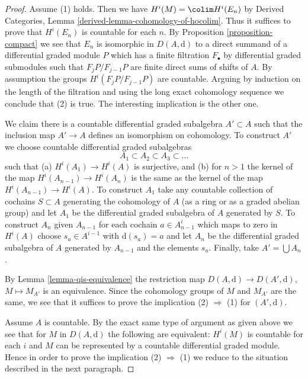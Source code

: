 \begin{proof}
Assume (1) holds. Then we have $H^i(M) = \colim H^i(E_n)$ by
Derived Categories, Lemma \ref{derived-lemma-cohomology-of-hocolim}.
Thus it suffices to prove that $H^i(E_n)$ is countable for each $n$.
By Proposition \ref{proposition-compact} we see that $E_n$
is isomorphic in $D(A, \text{d})$ to a direct summand of a
differential graded module $P$ which has a finite filtration
$F_\bullet$ by differential graded submodules
such that $F_jP/F_{j - 1}P$ are finite direct sums of shifts of $A$.
By assumption the groups $H^i(F_jP/F_{j - 1}P)$ are countable.
Arguing by induction on the length of the filtration and using
the long exact cohomology sequence we conclude that (2) is true.
The interesting implication is the other one.

\medskip\noindent
We claim there is a countable differential graded
subalgebra $A' \subset A$ such that the inclusion map
$A' \to A$ defines an isomorphism on cohomology.
To construct $A'$ we choose countable differential graded
subalgebras
$$
A_1 \subset A_2 \subset A_3 \subset \ldots
$$
such that (a) $H^i(A_1) \to H^i(A)$ is surjective, and (b)
for $n > 1$ the kernel of the map $H^i(A_{n - 1}) \to H^i(A_n)$
is the same as the kernel of the map $H^i(A_{n - 1}) \to H^i(A)$.
To construct $A_1$ take any countable collection of cochains
$S \subset A$ generating the cohomology of $A$ (as a ring or as
a graded abelian group) and let
$A_1$ be the differential graded subalgebra of $A$ generated by $S$.
To construct $A_n$ given $A_{n - 1}$ for each cochain $a \in A_{n - 1}^i$
which maps to zero in $H^i(A)$ choose $s_a \in A^{i - 1}$
with $\text{d}(s_a) = a$ and let $A_n$ be the differential graded
subalgebra of $A$ generated by $A_{n - 1}$ and the elements $s_a$.
Finally, take $A' = \bigcup A_n$.

\medskip\noindent
By Lemma \ref{lemma-qis-equivalence}
the restriction map $D(A, \text{d}) \to D(A', \text{d})$,
$M \mapsto M_{A'}$ is an equivalence. Since the cohomology
groups of $M$ and $M_{A'}$ are the same, we see that it
suffices to prove the implication (2) $\Rightarrow$ (1)
for $(A', \text{d})$.

\medskip\noindent
Assume $A$ is countable. By the exact same type of argument as
given above we see that for $M$ in $D(A, \text{d})$
the following are equivalent: $H^i(M)$ is countable for each $i$
and $M$ can be represented by a countable differential graded module.
Hence in order to prove the implication (2) $\Rightarrow$ (1)
we reduce to the situation described in the next paragraph.


\end{proof}
